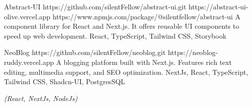 \documentclass[10pt,a4paper,ragged2e,withhyper]{altacv}
\begin{document}
\begin{paracol}{2}
\divider

\cvproject
  {Abstract-UI}
  {https://github.com/silentFellow/abstract-ui.git}
  {https://abstract-ui-olive.vercel.app}
  {https://www.npmjs.com/package/@silentfellow/abstract-ui}
  {A component library for React and Next.js. It offers reusable UI components to speed up web development.}
  {React, TypeScript, Tailwind CSS, Storybook}

\divider

\cvproject
  {NeoBlog}
  {https://github.com/silentFellow/neoblog.git}
  {https://neoblog-ruddy.vercel.app}
  {}
  {A blogging platform built with Next.js. Features rich text editing, multimedia support, and SEO optimization.}
  {NextJs, React, TypeScript, Tailwind CSS, Shadcn-UI, PostgresSQL}

\medskip



\switchcolumn


{\LaTeXraggedright
{}
\par}


\divider

\textit{(React, NextJs, NodeJs)}
\divider

\divider

\divider


{\LaTeXraggedright
{}
\par}

\medskip



\divider



\end{paracol}
\end{document}
